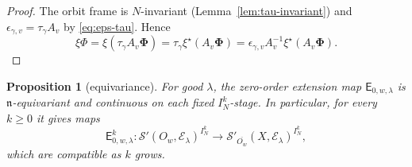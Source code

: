 \documentclass[a4paper,12pt]{amsart}
\numberwithin{equation}{section}
\newtheorem{proposition}[theorem]{Proposition}
\theoremstyle{definition}
\theoremstyle{remark}
\newcommand{\fn}{\mathfrak n}
\newcommand{\IN}{I_N}
\newcommand{\mcS}{\mathcal S}
\newcommand{\mcE}{\mathcal E}
\newcommand{\E}{\mathsf E}
\begin{document}
\begin{proof}
The orbit frame is $N$-invariant (Lemma~\ref{lem:tau-invariant}) and $\epsilon_{\gamma,v}=\tau_\gamma A_v$ by \eqref{eq:eps-tau}. Hence
\[
 \xi\Phi=\xi(\tau_\gamma A_v\boldsymbol\Phi)
 =\tau_\gamma\xi^\star(A_v\boldsymbol\Phi)
 =\epsilon_{\gamma,v}A_v^{-1}\xi^\star(A_v\boldsymbol\Phi).
\]
\end{proof}

\begin{proposition}[equivariance]\label{prop:equivariance}
For good $\lambda$, the zero-order extension map $\E_{0,w,\lambda}$ is $\fn$-equivariant and continuous on each fixed $\IN^k$-stage. In particular, for every $k\ge0$ it gives maps
\[
 \E^k_{0,w,\lambda}:\mcS'(O_w,\mcE_\lambda)^{\IN^k}\to\mcS'_{\overline{O_w}}(X,\mcE_\lambda)^{\IN^k},
\]
which are compatible as $k$ grows.
\end{proposition}
\end{document}
